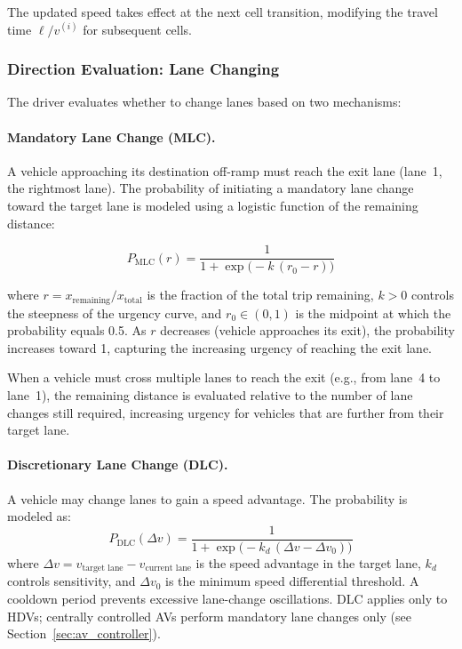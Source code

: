 \documentclass[review,authoryear]{elsarticle}
\begin{document}
The updated speed takes effect at the next cell transition, modifying the travel time $\ell / v^{(i)}$ for subsequent cells.

\subsubsection{Direction Evaluation: Lane Changing}
\label{sec:lane_changing}

The driver evaluates whether to change lanes based on two mechanisms:

\paragraph{Mandatory Lane Change (MLC).}
A vehicle approaching its destination off-ramp must reach the exit lane (lane~1, the rightmost lane). The probability of initiating a mandatory lane change toward the target lane is modeled using a logistic function of the remaining distance:

\begin{equation}
    P_{\text{MLC}}(r) = \frac{1}{1 + \exp\!\big(-k\,(r_0 - r)\big)}
    \label{eq:mlc_logistic}
\end{equation}

where $r = x_{\text{remaining}} / x_{\text{total}}$ is the fraction of the total trip remaining, $k > 0$ controls the steepness of the urgency curve, and $r_0 \in (0, 1)$ is the midpoint at which the probability equals 0.5. As $r$ decreases (vehicle approaches its exit), the probability increases toward 1, capturing the increasing urgency of reaching the exit lane.

When a vehicle must cross multiple lanes to reach the exit (e.g., from lane~4 to lane~1), the remaining distance is evaluated relative to the number of lane changes still required, increasing urgency for vehicles that are further from their target lane.

\paragraph{Discretionary Lane Change (DLC).}
A vehicle may change lanes to gain a speed advantage. The probability is modeled as:
\begin{equation}
    P_{\text{DLC}}(\Delta v) = \frac{1}{1 + \exp\!\big(-k_d\,(\Delta v - \Delta v_0)\big)}
    \label{eq:dlc_logistic}
\end{equation}
where $\Delta v = v_{\text{target lane}} - v_{\text{current lane}}$ is the speed advantage in the target lane, $k_d$ controls sensitivity, and $\Delta v_0$ is the minimum speed differential threshold. A cooldown period prevents excessive lane-change oscillations. DLC applies only to HDVs; centrally controlled AVs perform mandatory lane changes only (see Section~\ref{sec:av_controller}).
\end{document}
